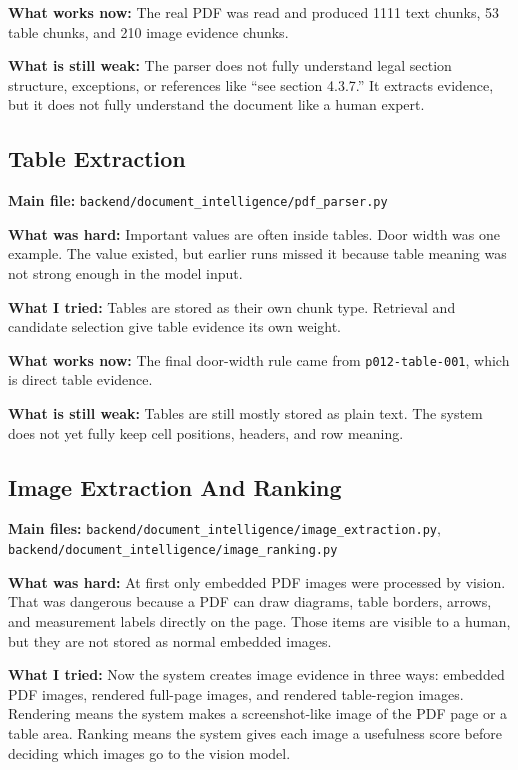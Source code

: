 \documentclass[11pt,a4paper]{article}
\begin{document}
\textbf{What works now:}
The real PDF was read and produced 1111 text chunks, 53 table chunks, and 210 image evidence chunks.

\textbf{What is still weak:}
The parser does not fully understand legal section structure, exceptions, or references like ``see section 4.3.7.'' It extracts evidence, but it does not fully understand the document like a human expert.

\subsection{Table Extraction}
\textbf{Main file:} \texttt{backend/document\_intelligence/pdf\_parser.py}

\textbf{What was hard:}
Important values are often inside tables. Door width was one example. The value existed, but earlier runs missed it because table meaning was not strong enough in the model input.

\textbf{What I tried:}
Tables are stored as their own chunk type. Retrieval and candidate selection give table evidence its own weight.

\textbf{What works now:}
The final door-width rule came from \texttt{p012-table-001}, which is direct table evidence.

\textbf{What is still weak:}
Tables are still mostly stored as plain text. The system does not yet fully keep cell positions, headers, and row meaning.

\subsection{Image Extraction And Ranking}
\textbf{Main files:} \texttt{backend/document\_intelligence/image\_extraction.py}, \texttt{backend/document\_intelligence/image\_ranking.py}

\textbf{What was hard:}
At first only embedded PDF images were processed by vision. That was dangerous because a PDF can draw diagrams, table borders, arrows, and measurement labels directly on the page. Those items are visible to a human, but they are not stored as normal embedded images.

\textbf{What I tried:}
Now the system creates image evidence in three ways: embedded PDF images, rendered full-page images, and rendered table-region images. Rendering means the system makes a screenshot-like image of the PDF page or a table area. Ranking means the system gives each image a usefulness score before deciding which images go to the vision model.
\end{document}
